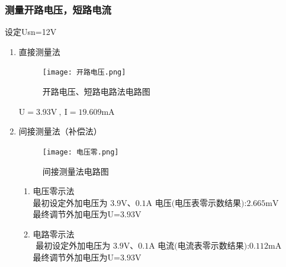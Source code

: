 \documentclass[dvipsnames, svgnames,a4paper,11pt]{article}
\begin{document}
	\subsubsection{测量开路电压，短路电流} 
	设定Usn=12V
	\begin{enumerate}
		\item
		直接测量法
		 \begin{figure}[H]
			\centering
			\texttt{[image: 开路电压.png]}
			\caption{开路电压、短路电路法电路图}
			\label{}
		  \end{figure}
		 $\mathrm{U=3.93V~,~I=19.609mA}$
		  \item 间接测量法（补偿法）
		 \begin{figure}[H]
			\centering
			\texttt{[image: 电压零.png]}
			\caption{间接测量法电路图}
			\label{}
		 \end{figure}
		 \begin{enumerate}
	     
		 \item 电压零示法\\
		 $\text{最初设定外加电压为 3.9V、0.1A   电压(电压表零示数结果):2.665mV }$\\
		 最终调节外加电压为$\text{U=3.93V}$
		 
		 \item 电路零示法\\
		 $\text{ 最初设定外加电压为 3.9V、0.1A  电流(电流表零示数结果):0.112mA }$\\
		 最终调节外加电压为$\text{U=3.93V}$
		 
		 \end{enumerate}	
		 
		 
	    
		
	\end{enumerate}	
\end{document}
